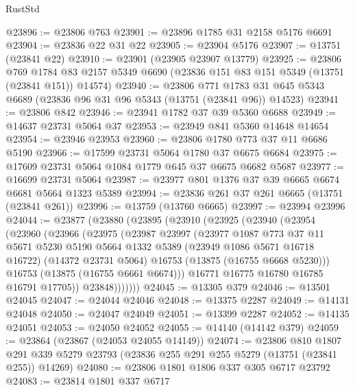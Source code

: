\begin{lexlean}{RustStd}
\begin{coremodule}
@23896 := @23806 @763
@23901 := @23896 @1785 @31 @2158 @5176 @6691
@23904 := @23836 @22 @31 @22
@23905 := @23904 @5176
@23907 := @13751 (@23841 @22)
@23910 := @23901 (@23905 @23907 @13779)
@23925 := @23806
    @769
    @1784
    @83
    @2157
    @5349
    @6690
    (@23836 @151 @83 @151 @5349 (@13751 (@23841 @151)) @14574)
@23940 := @23806
    @771
    @1783
    @31
    @645
    @5343
    @6689
    (@23836 @96 @31 @96 @5343 (@13751 (@23841 @96)) @14523)
@23941 := @23806 @842
@23946 := @23941 @1782 @37 @39 @5360 @6688
@23949 := @14637 @23731 @5064 @37
@23953 := @23949 @841 @5360 @14648 @14654
@23954 := @23946 @23953
@23960 := @23806 @1780 @773 @37 @11 @6686 @5190
@23966 := @17599 @23731 @5064 @1780 @37 @6675 @6684
@23975 := @17609 @23731 @5064 @1084 @1779 @645 @37 @6675 @6682 @5687
@23977 := @16699 @23731 @5064
@23987 := @23977 @801 @1376 @37 @39 @6665 @6674 @6681 @5664 @1323 @5389
@23994 := @23836 @261 @37 @261 @6665 (@13751 (@23841 @261))
@23996 := @13759 (@13760 @6665)
@23997 := @23994 @23996
@24044 := @23877
    (@23880
      (@23895
        (@23910
          (@23925
            (@23940
              (@23954
                (@23960
                  (@23966
                    (@23975
                      (@23987
                        @23997
                        (@23977
                          @1087
                          @773
                          @37
                          @11
                          @5671
                          @5230
                          @5190
                          @5664
                          @1332
                          @5389
                          (@23949 @1086 @5671 @16718 @16722)
                          (@14372 @23731 @5064)
                          @16753
                          (@13875 (@16755 @6668 @5230)))
                        @16753
                        (@13875 (@16755 @6661 @6674)))
                      @16771
                      @16775
                      @16780
                      @16785
                      @16791
                      @17705))
                  @23848)))))))
@24045 := @13305 @379
@24046 := @13501 @24045
@24047 := @24044 @24046
@24048 := @13375 @2287
@24049 := @14131 @24048
@24050 := @24047 @24049
@24051 := @13399 @2287
@24052 := @14135 @24051
@24053 := @24050 @24052
@24055 := @14140 (@14142 @379)
@24059 := @23864 (@23867 (@24053 @24055 @14149))
@24074 := @23806
    @810
    @1807
    @291
    @339
    @5279
    @23793
    (@23836 @255 @291 @255 @5279 (@13751 (@23841 @255)) @14269)
@24080 := @23806 @1801 @1806 @337 @305 @6717 @23792
@24083 := @23814 @1801 @337 @6717

\end{coremodule}
\end{lexlean}
